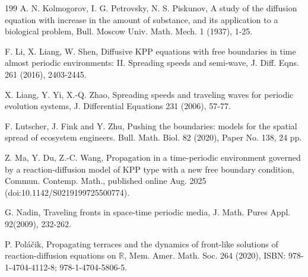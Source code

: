 \documentclass[11pt]{amsart}
\numberwithin{equation}{section}
\begin{document}
\begin{thebibliography}{199}
 A. N. Kolmogorov, I. G. Petrovsky, N. S. Piskunov, A study of the diffusion equation with increase in the amount of substance, and its application to a biological problem, Bull. Moscow Univ. Math. Mech. 1 (1937), 1-25.
 

 F. Li, X. Liang, W. Shen, Diffusive KPP equations with free boundaries in time almost periodic environments:
II. Spreading speeds and semi-wave, J. Diff. Eqns. 261 (2016), 2403-2445.


X. Liang, Y. Yi,  X.-Q. Zhao, Spreading speeds and traveling waves for periodic evolution systems, J. Differential Equations 231 (2006),  57-77.


 F. Lutscher, J. Fink and Y. Zhu,  Pushing the boundaries: models for the spatial spread of ecosystem engineers. Bull. Math. Biol. 82 (2020),  Paper No. 138, 24 pp. 

Z. Ma, Y. Du, Z.-C. Wang, Propagation in a time-periodic environment governed by a reaction-diffusion model of KPP type with a new free boundary condition, Commun. Contemp. Math., published online Aug. 2025 (doi:10.1142/S0219199725500774).



G. Nadin, Traveling fronts in space-time periodic media,
J. Math. Pures Appl. 92(2009), 232-262.

 

P. Pol\'{a}\v{c}ik, Propagating terraces and the dynamics of front-like solutions of reaction-diffusion equations on $\mathbb{R}$, Mem. Amer. Math. Soc. 264 (2020), ISBN: 978-1-4704-4112-8; 978-1-4704-5806-5.


\end{thebibliography}
\end{document}
